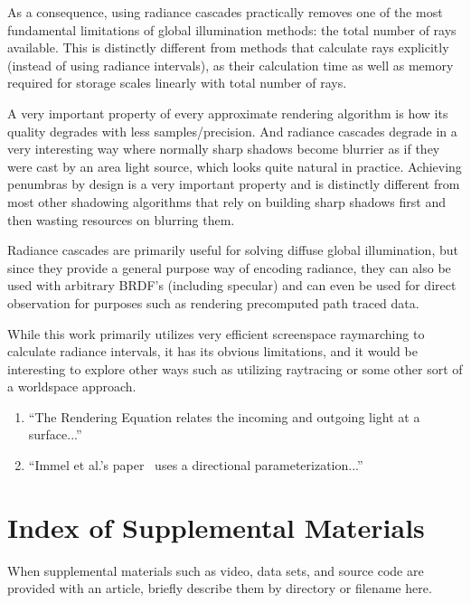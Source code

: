 \documentclass{jcgt}
\begin{document}
As a consequence, using radiance cascades practically removes one of the most fundamental limitations of global illumination methods: the total number of rays available. This is distinctly different from methods that calculate rays explicitly (instead of using radiance intervals), as their calculation time as well as memory required for storage scales linearly with total number of rays.

A very important property of every approximate rendering algorithm is how its quality degrades with less samples/precision. And radiance cascades degrade in a very interesting way where normally sharp shadows become blurrier as if they were cast by an area light source, which looks quite natural in practice. Achieving penumbras by design is a very important property and is distinctly different from most other shadowing algorithms that rely on building sharp shadows first and then wasting resources on blurring them. 

Radiance cascades are primarily useful for solving diffuse global illumination, but since they provide a general purpose way of encoding radiance, they can also be used with arbitrary BRDF's (including specular) and can even be used for direct observation for purposes such as rendering precomputed path traced data.

While this work primarily utilizes very efficient screenspace raymarching to calculate radiance intervals, it has its obvious limitations, and it would be interesting to explore other ways such as utilizing raytracing or some other sort of a worldspace approach.


\begin{enumerate}
\item ``The Rendering Equation \cite{Immel:1986:RMN:15886.15901,Kajiya:1986:RE:15922.15902} relates the incoming and outgoing light at a surface...''
\item ``Immel et al.'s paper~ uses a directional parameterization...''
\end{enumerate}

\small



\section*{Index of Supplemental Materials}
When supplemental materials such as video, data sets, and source code are provided with an article, briefly describe them by directory or filename here.
\end{document}
